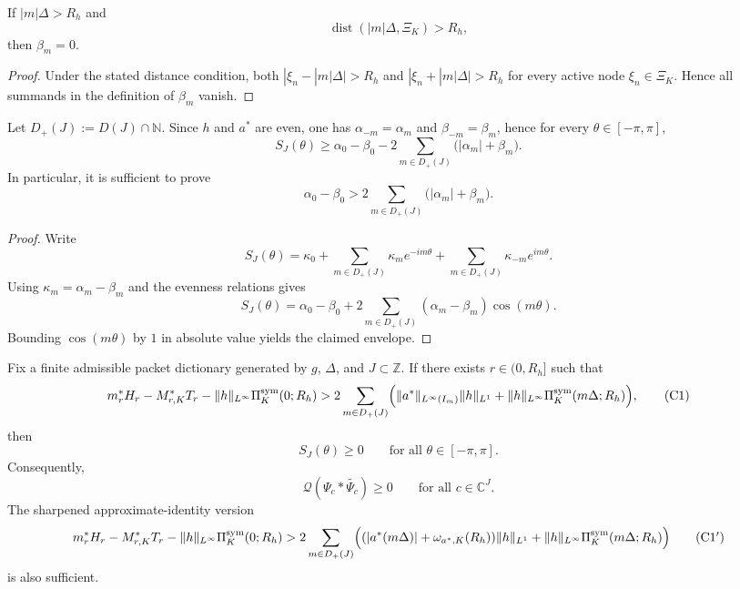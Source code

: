 \begin{lemma}\label{lem:packet-beta-vanishing}
If $|m|\Delta>R_h$ and
\[
  \operatorname{dist}(|m|\Delta,\Xi_K)>R_h,
\]
then $\beta_m=0$.
\end{lemma}

\begin{proof}
Under the stated distance condition, both
$|\xi_n-|m|\Delta|>R_h$ and $|\xi_n+|m|\Delta|>R_h$ for every active node
$\xi_n\in\Xi_K$. Hence all summands in the definition of $\beta_m$ vanish.
\end{proof}

\begin{proposition}\label{prop:finite-symbol-envelope}
Let $D_+(J):=D(J)\cap\mathbb N$. Since $h$ and $a^*$ are even, one has
$\alpha_{-m}=\alpha_m$ and $\beta_{-m}=\beta_m$, hence for every
$\theta\in[-\pi,\pi]$,
\[
  S_J(\theta)
  \ge
  \alpha_0-\beta_0
  -
  2\sum_{m\in D_+(J)}\bigl(|\alpha_m|+\beta_m\bigr).
\]
In particular, it is sufficient to prove
\[
  \alpha_0-\beta_0
  >
  2\sum_{m\in D_+(J)}\bigl(|\alpha_m|+\beta_m\bigr).
  \tag{C0}
\]
\end{proposition}

\begin{proof}
Write
\[
  S_J(\theta)
  =
  \kappa_0+\sum_{m\in D_+(J)}\kappa_m e^{-im\theta}
  +\sum_{m\in D_+(J)}\kappa_{-m} e^{im\theta}.
\]
Using $\kappa_m=\alpha_m-\beta_m$ and the evenness relations gives
\[
  S_J(\theta)
  =
  \alpha_0-\beta_0
  +
  2\sum_{m\in D_+(J)}(\alpha_m-\beta_m)\cos(m\theta).
\]
Bounding $\cos(m\theta)$ by $1$ in absolute value yields the claimed envelope.
\end{proof}

\begin{proposition}\label{prop:packet-explicit-sufficient-criterion}
Fix a finite admissible packet dictionary generated by $g$, $\Delta$, and
$J\subset\mathbb Z$. If there exists $r\in(0,R_h]$ such that
\[
  m_r^*H_r - M_{r,K}^*T_r - \|h\|_{L^\infty}\Pi_K^{\mathrm{sym}}(0;R_h)
  >
  2\sum_{m\in D_+(J)}
  \Bigl(
    \|a^*\|_{L^\infty(I_m)}\|h\|_{L^1}
    +
    \|h\|_{L^\infty}\Pi_K^{\mathrm{sym}}(m\Delta;R_h)
  \Bigr),
  \tag{C1}
\]
then
\[
  S_J(\theta)\ge0
  \qquad\text{for all }\theta\in[-\pi,\pi].
\]
Consequently,
\[
  \mathcal Q(\Psi_c*\widetilde{\Psi_c})\ge0
  \qquad\text{for all }c\in\mathbb C^J.
\]
The sharpened approximate-identity version
\[
  m_r^*H_r - M_{r,K}^*T_r - \|h\|_{L^\infty}\Pi_K^{\mathrm{sym}}(0;R_h)
  >
  2\sum_{m\in D_+(J)}
  \Bigl(
    (|a^*(m\Delta)|+\omega_{a^*,K}(R_h))\|h\|_{L^1}
    +
    \|h\|_{L^\infty}\Pi_K^{\mathrm{sym}}(m\Delta;R_h)
  \Bigr)
  \tag{C1$'$}
\]
is also sufficient.
\end{proposition}

